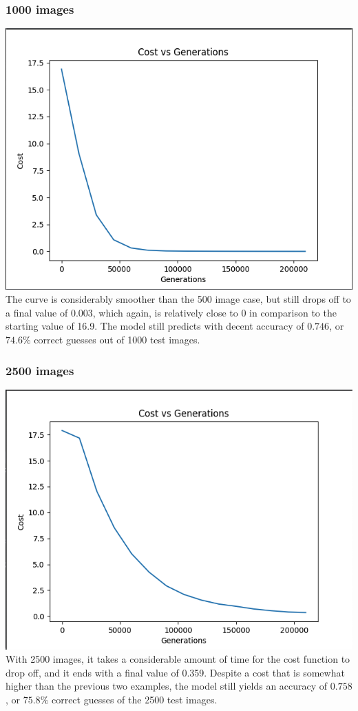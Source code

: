 \documentclass[12pt]{article}
\begin{document}
\subsubsection*{1000 images}
\includegraphics*[scale=0.5]{1ktask2}\\
The curve is considerably smoother than the 500 image case, but still drops off to a final value of 0.003, which 
again, is relatively close to 0 in comparison to the starting value of 16.9. The model still predicts with decent accuracy
of $0.746$, 
or $74.6 \%$ correct guesses out of 1000 test images.  

\subsubsection*{2500 images}
\includegraphics*[scale=0.5]{2500task2}\\
With 2500 images, it takes a considerable amount of time for the cost function to drop off, and it ends with a final value of 
0.359. Despite a cost that is somewhat higher than the previous two examples, the model still yields an accuracy of 
$0.758$, or $75.8 \%$ correct guesses of the 2500 test images. 
\end{document}
